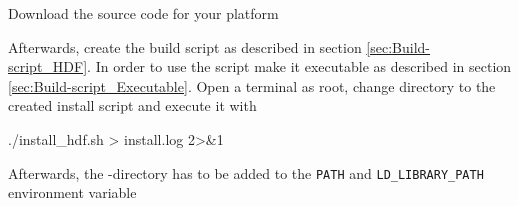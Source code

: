 \href{\hdfaddress}{\hdfaddress}

Download the source code for your platform

\begingroup
\lstset{breaklines=true}
\endgroup

Afterwards, create the \marktool{\hdfname} build script as described in section \ref{sec:Build-script_HDF}. In order to use the script make it executable as described in section \ref{sec:Build-script_Executable}. Open a terminal as root, change directory to the created install script and execute it with

\begin{code}
./install_hdf.sh > install.log 2>&1
\end{code}

Afterwards, the \marktool{\hdfname}-directory has to be added to the \verb+PATH+ and \verb+LD_LIBRARY_PATH+ environment variable

\begingroup
\lstset{breaklines = true}

\endgroup 